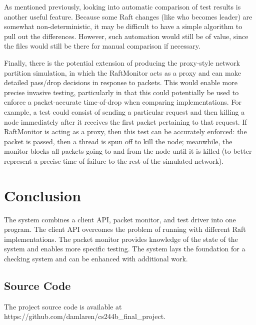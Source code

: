 \documentclass[UTF8]{article}
\begin{document}
As mentioned previously, looking into automatic comparison of test results is another useful feature. Because some Raft changes (like who becomes leader) are somewhat non-deterministic, it may be difficult to have a simple algorithm to pull out the differences. However, such automation would still be of value, since the files would still be there for manual comparison if necessary.

Finally, there is the potential extension of producing the proxy-style network partition simulation, in which the RaftMonitor acts as a proxy and can make detailed pass/drop decisions in response to packets. This would enable more precise invasive testing, particularly in that this could potentially be used to enforce a packet-accurate time-of-drop when comparing implementations. For example, a test could consist of sending a particular request and then killing a node immediately after it receives the first packet pertaining to that request. If RaftMonitor is acting as a proxy, then this test can be accurately enforced: the packet is passed, then a thread is spun off to kill the node; meanwhile, the monitor blocks all packets going to and from the node until it is killed (to better represent a precise time-of-failure to the rest of the simulated network).

\section{Conclusion}

The system combines a client API, packet monitor, and test driver into one program. The client API overcomes the problem of running with different Raft implementations. The packet monitor provides knowledge of the state of the system and enables more specific testing. The system lays the foundation for a checking system and can be enhanced with additional work.

\subsection{Source Code}

The project source code is available at https://github.com/damlaren/cs244b\_final\_project.



\end{document}

